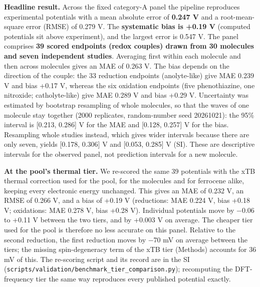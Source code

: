 \documentclass[journal=jcisd8,manuscript=article]{achemso}
\begin{document}
\textbf{Headline result.} Across the fixed category-A panel the pipeline reproduces experimental potentials with a mean absolute error of \textbf{0.247 V} and a root-mean-square error (RMSE) of 0.279 V. The \textbf{systematic bias is +0.19 V} (computed potentials sit above experiment), and the largest error is 0.547 V. The panel comprises \textbf{39 scored endpoints (redox couples) drawn from 30 molecules and seven independent studies}. Averaging first within each molecule and then across molecules gives an MAE of 0.263 V. The bias depends on the direction of the couple: the 33 reduction endpoints (anolyte-like) give MAE 0.239 V and bias +0.17 V, whereas the six oxidation endpoints (five phenothiazine, one nitroxide; catholyte-like) give MAE 0.289 V and bias +0.29 V. Uncertainty was estimated by bootstrap resampling of whole molecules, so that the waves of one molecule stay together (2000 replicates, random-number seed 20261021): the 95\% interval is [0.213, 0.286] V for the MAE and [0.128, 0.257] V for the bias. Resampling whole studies instead, which gives wider intervals because there are only seven, yields [0.178, 0.306] V and [0.053, 0.285] V (SI). These are descriptive intervals for the observed panel, not prediction intervals for a new molecule.

\textbf{At the pool's thermal tier.} We re-scored the same 39 potentials with the xTB thermal correction used for the pool, for the molecules and for ferrocene alike, keeping every electronic energy unchanged. This gives an MAE of 0.232 V, an RMSE of 0.266 V, and a bias of +0.19 V (reductions: MAE 0.224 V, bias +0.18 V; oxidations: MAE 0.278 V, bias +0.28 V). Individual potentials move by −0.06 to +0.11 V between the two tiers, and by +0.003 V on average. The cheaper tier used for the pool is therefore no less accurate on this panel. Relative to the second reduction, the first reduction moves by −70 mV on average between the tiers; the missing spin-degeneracy term of the xTB tier (Methods) accounts for 36 mV of this. The re-scoring script and its record are in the SI (\texttt{scripts/validation/benchmark\_tier\_comparison.py}); recomputing the DFT-frequency tier the same way reproduces every published potential exactly.
\end{document}
